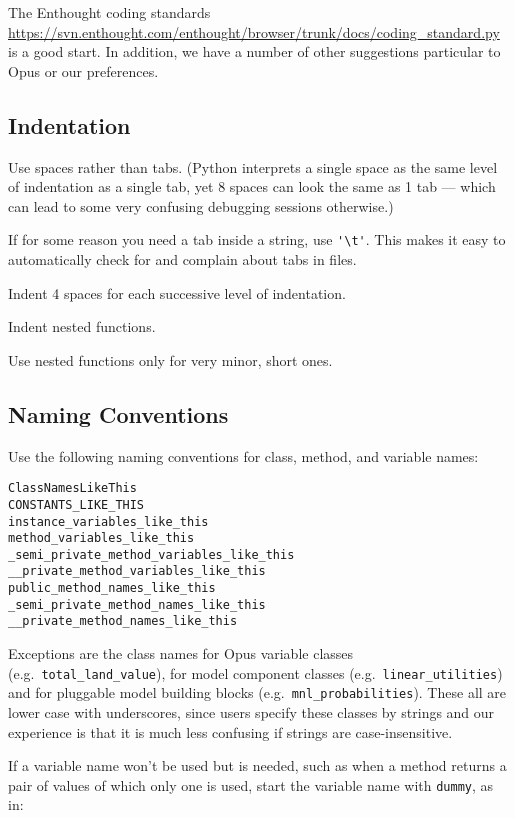 The Enthought coding standards
\url{https://svn.enthought.com/enthought/browser/trunk/docs/coding_standard.py}
is a good start.  In addition, we have a number of other suggestions particular
to Opus or our preferences.

\subsection{Indentation}

Use spaces rather than tabs.  (Python interprets a single space as the same
level of indentation
as a single tab, yet 8 spaces can look the same as 1 tab --- which can lead
to some very confusing debugging sessions otherwise.)

If for some reason you need a tab inside a
string, use \verb|'\t'|.  This makes it easy to automatically check for and
complain about tabs in files.

Indent 4 spaces for each successive level of indentation.

Indent nested functions.

Use nested functions only for very minor, short ones.

\subsection{Naming Conventions}

Use the following naming conventions for class, method, and variable names:

\begin{verbatim}
ClassNamesLikeThis
CONSTANTS_LIKE_THIS
instance_variables_like_this
method_variables_like_this
_semi_private_method_variables_like_this
__private_method_variables_like_this
public_method_names_like_this
_semi_private_method_names_like_this
__private_method_names_like_this
\end{verbatim}

Exceptions are the class names for Opus variable classes (e.g.\
\mbox{\tt total_land_value}), for model component classes (e.g.\
\mbox{\tt linear_utilities}) and for pluggable model building
blocks (e.g.\ \verb|mnl_probabilities|).  These all are lower case
with underscores, since users specify these classes by strings
and our experience is that it is much less confusing if strings are
case-insensitive.

If a variable name won't be used but is needed, such as when a method returns
a pair of values of which only one is used, start the variable name with 
\verb|dummy|, as in:

